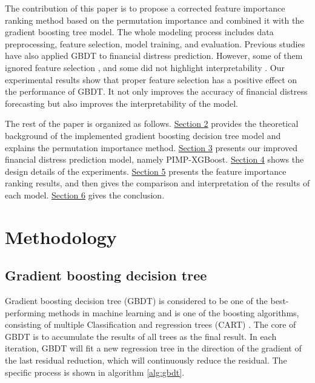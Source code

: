 \documentclass[review]{elsarticle}
\begin{document}
The contribution of this paper is to propose a corrected feature importance ranking method based on the permutation importance and combined it with the gradient boosting tree model. The whole modeling process includes data preprocessing, feature selection, model training, and evaluation. Previous studies have also applied GBDT to financial distress prediction. However, some of them ignored feature selection \citep{Son2019, Wyrobek2019}, and some did not highlight interpretability \citep{Zieba2016}. Our experimental results show that proper feature selection has a positive effect on the performance of GBDT. It not only improves the accuracy of financial distress forecasting but also improves the interpretability of the model.

The rest of the paper is organized as follows. \hyperref[section_2]{Section 2} provides the theoretical background of the implemented gradient boosting decision tree model and explains the permutation importance method. \hyperref[section_3]{Section 3} presents our improved financial distress prediction model, namely PIMP-XGBoost. \hyperref[section_4]{Section 4} shows the design details of the experiments. \hyperref[section_5]{Section 5} presents the feature importance ranking results, and then gives the comparison and interpretation of the results of each model. \hyperref[section_6]{Section 6} gives the conclusion.


\section{Methodology}
\label{section_2}
\subsection{Gradient boosting decision tree}
Gradient boosting decision tree (GBDT) is considered to be one of the best-performing methods in machine learning and is one of the boosting algorithms, consisting of multiple Classification and regression trees (CART) \citep{Friedman2001}. The core of GBDT is to accumulate the results of all trees as the final result. In each iteration, GBDT will fit a new regression tree in the direction of the gradient of the last residual reduction, which will continuously reduce the residual. The specific process is shown in algorithm \ref{alg:gbdt}.
\end{document}
